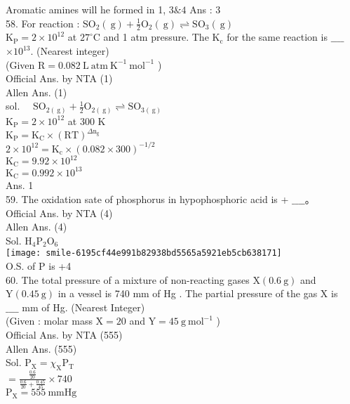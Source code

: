 \documentclass[10pt]{article}
\begin{document}
Aromatic amines will he formed in 1, \(3 \& 4\) Ans : 3\\
58. For reaction : \(\mathrm{SO}_{2}(\mathrm{~g})+\frac{1}{2} \mathrm{O}_{2}(\mathrm{~g}) \rightleftharpoons \mathrm{SO}_{3}(\mathrm{~g})\)\\
\(\mathrm{K}_{\mathrm{P}}=2 \times 10^{12}\) at \(27^{\circ} \mathrm{C}\) and 1 atm pressure. The \(\mathrm{K}_{\mathrm{c}}\) for the same reaction is \(\_\_\_\_\) \(\times 10^{13}\). (Nearest integer)\\
(Given \(\mathrm{R}=0.082 \mathrm{~L} \mathrm{~atm} \mathrm{~K}^{-1} \mathrm{~mol}^{-1}\) )\\
Official Ans. by NTA (1)\\
Allen Ans. (1)\\
sol. \(\quad \mathrm{SO}_{2(\mathrm{~g})}+\frac{1}{2} \mathrm{O}_{2(\mathrm{~g})} \rightleftharpoons \mathrm{SO}_{3(\mathrm{~g})}\)\\
\(\mathrm{K}_{\mathrm{P}}=2 \times 10^{12}\) at 300 K\\
\(\mathrm{K}_{\mathrm{P}}=\mathrm{K}_{\mathrm{C}} \times(\mathrm{RT})^{\Delta \mathrm{n}_{\mathrm{g}}}\)\\
\(2 \times 10^{12}=\mathrm{K}_{\mathrm{c}} \times(0.082 \times 300)^{-1 / 2}\)\\
\(\mathrm{K}_{\mathrm{C}}=9.92 \times 10^{12}\)\\
\(\mathrm{K}_{\mathrm{C}}=0.992 \times 10^{13}\)\\
Ans. 1\\
59. The oxidation sate of phosphorus in hypophosphoric acid is + \(\_\_\_\_\)。\\
Official Ans. by NTA (4)\\
Allen Ans. (4)\\
Sol. \(\mathrm{H}_{4} \mathrm{P}_{2} \mathrm{O}_{6}\)\\
\texttt{[image: smile-6195cf44e991b82938bd5565a5921eb5cb638171]}\\
O.S. of P is +4\\
60. The total pressure of a mixture of non-reacting gases \(\mathrm{X}(0.6 \mathrm{~g})\) and \(\mathrm{Y}(0.45 \mathrm{~g})\) in a vessel is 740 mm of Hg . The partial pressure of the gas X is\\
\(\_\_\_\_\) mm of Hg. (Nearest Integer)\\
(Given : molar mass \(\mathrm{X}=20\) and \(\mathrm{Y}=45 \mathrm{~g} \mathrm{~mol}^{-1}\) )\\
Official Ans. by NTA (555)\\
Allen Ans. (555)\\
Sol. \(\mathrm{P}_{\mathrm{X}}=\chi_{\mathrm{X}} \mathrm{P}_{\mathrm{T}}\)\\
\(=\frac{\frac{0.6}{20}}{\frac{0.6}{20}+\frac{0.45}{45}} \times 740\)\\
\(\mathrm{P}_{\mathrm{X}}=555 \mathrm{~mm} \mathrm{Hg}\)
\end{document}
